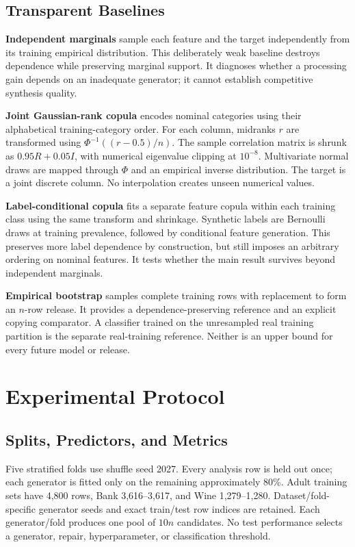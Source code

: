 \documentclass{svproc}
\begin{document}
\subsection{Transparent Baselines}
\textbf{Independent marginals} sample each feature and the target independently from its training empirical distribution. This deliberately weak baseline destroys dependence while preserving marginal support. It diagnoses whether a processing gain depends on an inadequate generator; it cannot establish competitive synthesis quality.

\textbf{Joint Gaussian-rank copula} encodes nominal categories using their alphabetical training-category order. For each column, midranks $r$ are transformed using $\Phi^{-1}((r-0.5)/n)$. The sample correlation matrix is shrunk as $0.95R+0.05I$, with numerical eigenvalue clipping at $10^{-8}$. Multivariate normal draws are mapped through $\Phi$ and an empirical inverse distribution. The target is a joint discrete column. No interpolation creates unseen numerical values.

\textbf{Label-conditional copula} fits a separate feature copula within each training class using the same transform and shrinkage. Synthetic labels are Bernoulli draws at training prevalence, followed by conditional feature generation. This preserves more label dependence by construction, but still imposes an arbitrary ordering on nominal features. It tests whether the main result survives beyond independent marginals.

\textbf{Empirical bootstrap} samples complete training rows with replacement to form an $n$-row release. It provides a dependence-preserving reference and an explicit copying comparator. A classifier trained on the unresampled real training partition is the separate real-training reference. Neither is an upper bound for every future model or release.

\section{Experimental Protocol}
\subsection{Splits, Predictors, and Metrics}
Five stratified folds use shuffle seed 2027. Every analysis row is held out once; each generator is fitted only on the remaining approximately 80\%. Adult training sets have 4,800 rows, Bank 3,616--3,617, and Wine 1,279--1,280. Dataset/fold-specific generator seeds and exact train/test row indices are retained. Each generator/fold produces one pool of $10n$ candidates. No test performance selects a generator, repair, hyperparameter, or classification threshold.
\end{document}
